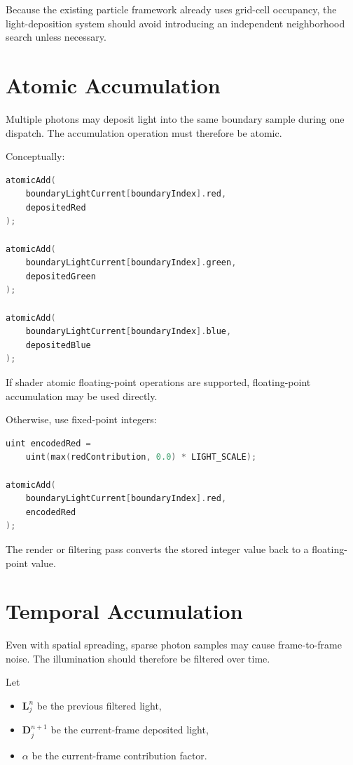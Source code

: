 \documentclass[11pt]{article}
\begin{document}
Because the existing particle framework already uses grid-cell occupancy, the
light-deposition system should avoid introducing an independent neighborhood
search unless necessary.

\section{Atomic Accumulation}

Multiple photons may deposit light into the same boundary sample during one
dispatch. The accumulation operation must therefore be atomic.

Conceptually:

\begin{lstlisting}[language=C++]
atomicAdd(
    boundaryLightCurrent[boundaryIndex].red,
    depositedRed
);

atomicAdd(
    boundaryLightCurrent[boundaryIndex].green,
    depositedGreen
);

atomicAdd(
    boundaryLightCurrent[boundaryIndex].blue,
    depositedBlue
);
\end{lstlisting}

If shader atomic floating-point operations are supported, floating-point
accumulation may be used directly.

Otherwise, use fixed-point integers:

\begin{lstlisting}[language=C++]
uint encodedRed =
    uint(max(redContribution, 0.0) * LIGHT_SCALE);

atomicAdd(
    boundaryLightCurrent[boundaryIndex].red,
    encodedRed
);
\end{lstlisting}

The render or filtering pass converts the stored integer value back to a
floating-point value.

\section{Temporal Accumulation}

Even with spatial spreading, sparse photon samples may cause frame-to-frame
noise. The illumination should therefore be filtered over time.

Let

\begin{itemize}
    \item $\mathbf{L}_{j}^{n}$ be the previous filtered light,
    \item $\mathbf{D}_{j}^{n+1}$ be the current-frame deposited light,
    \item $\alpha$ be the current-frame contribution factor.
\end{itemize}
\end{document}
